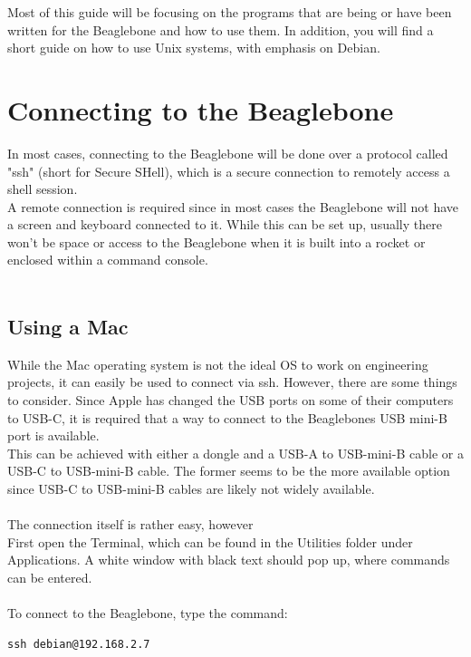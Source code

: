 \documentclass[12pt,article]{memoir}
\begin{document}
\noindent
Most of this guide will be focusing on the programs that are being or have been written for the Beaglebone and how to use them. In addition, you will find a short guide on how to use Unix systems, with emphasis on Debian.\\

\newpage
\section{Connecting to the Beaglebone}
In most cases, connecting to the Beaglebone will be done over a protocol called "ssh" (short for Secure SHell), which is a secure connection to remotely access a shell session.\\

\noindent
A remote connection is required since in most cases the Beaglebone will not have a screen and keyboard connected to it. While this can be set up, usually there won’t be space or access to the Beaglebone when it is built into a rocket or enclosed within a command console.\\\\

\subsection{Using a Mac}
While the Mac operating system is not the ideal OS  to work on engineering projects, it can easily be used to connect via ssh. However, there are some things to consider. Since Apple has changed the USB ports on some of their computers to USB-C, it is required that a way to connect to the Beaglebones USB mini-B port is available.\\
This can be achieved with either a dongle and a USB-A to USB-mini-B cable or a USB-C to USB-mini-B cable. The former seems to be the more available option since USB-C to USB-mini-B cables are likely not widely available.\\\\

\noindent
The connection itself is rather easy, however\\
First open the Terminal, which can be found in the Utilities folder under Applications. A white window with black text should pop up, where commands can be entered.\\\\
\noindent
To connect to the Beaglebone, type the command:\\

\begin{lstlisting}
ssh debian@192.168.2.7
\end{lstlisting}
\end{document}
